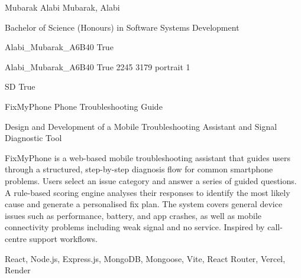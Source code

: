 
\begingroup{}\relax



\def\Key{Alabi_Mubarak_A6B40}

{Mubarak Alabi}
{Mubarak, Alabi}

{Bachelor of Science (Honours) in Software Systems Development}

{Alabi_Mubarak_A6B40}
{True}

{Alabi_Mubarak_A6B40}
{True}
{2245}
{3179}
{portrait}
{1}

{SD}
{True}

{FixMyPhone Phone Troubleshooting Guide}

{Design and Development of a Mobile Troubleshooting Assistant and Signal Diagnostic Tool}

{FixMyPhone is a web-based mobile troubleshooting assistant that guides users through a structured, step-by-step diagnosis flow for common smartphone problems. Users select an issue category and answer a series of guided questions. A rule-based scoring engine analyses their responses to identify the most likely cause and generate a personalised fix plan. The system covers general device issues such as performance, battery, and app crashes, as well as mobile connectivity problems including weak signal and no service. Inspired by call-centre support workflows.}

{React, Node.js, Express.js, MongoDB, Mongoose, Vite, React Router, Vercel, Render}

